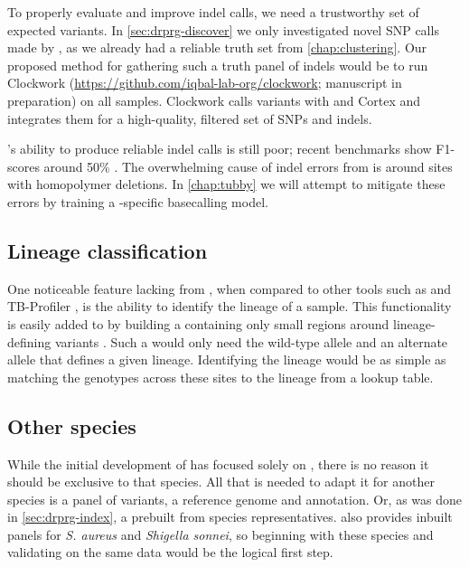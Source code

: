 To properly evaluate and improve indel calls, we need a trustworthy set of expected variants. In \autoref{sec:drprg-discover} we only investigated novel SNP calls made by \drprg{}, as we already had a reliable truth set from \autoref{chap:clustering}. Our proposed method for gathering such a truth panel of indels would be to run Clockwork (\url{https://github.com/iqbal-lab-org/clockwork}; manuscript in preparation) on all samples. Clockwork calls variants with  and Cortex and integrates them for a high-quality, filtered set of SNPs and indels.

\ont{}'s ability to produce reliable indel calls is still poor; recent benchmarks show F1-scores around 50\% \cite{clairvoyant2019}. The overwhelming cause of indel errors from \ont{} is around sites with homopolymer deletions. In \autoref{chap:tubby} we will attempt to mitigate these errors by training a \mtb{}-specific \ont{} basecalling model.

\subsection{Lineage classification}

One noticeable feature lacking from \drprg{}, when compared to other tools such as \mykrobe{} and TB-Profiler \cite{phelan2019}, is the ability to identify the lineage of a sample. This functionality is easily added to \drprg{} by building a \prg{} containing only small regions around lineage-defining variants \cite{Shitikov2017,Rutaihwa2019,stucki2016}. Such a \prg{} would only need the wild-type allele and an alternate allele that defines a given lineage. Identifying the lineage would be as simple as matching the genotypes across these sites to the lineage from a lookup table.

\subsection{Other species}

While the initial development of \drprg{} has focused solely on \mtb{}, there is no reason it should be exclusive to that species. All that is needed to adapt it for another species is a panel of variants, a reference genome and annotation. Or, as was done in \autoref{sec:drprg-index}, a prebuilt \prg{} from species representatives. \mykrobe{} also provides inbuilt panels for \textit{S. aureus} and \textit{Shigella sonnei}, so beginning with these species and validating on the same data would be the logical first step. 

